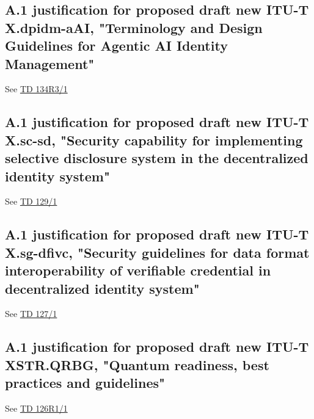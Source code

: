\newpage

\subsection*{A.1 justification for proposed draft new ITU-T X.dpidm-aAI, "Terminology and Design Guidelines for Agentic AI Identity Management"}
See \href{https://www.itu.int/md/meetingdoc.asp?lang=en\&parent=T25-SG17-251203-TD-WP1-0134}{TD 134R3/1}

\newpage

\subsection*{A.1 justification for proposed draft new ITU-T X.sc-sd, "Security capability for implementing selective disclosure system in the decentralized identity system"}
See \href{https://www.itu.int/md/meetingdoc.asp?lang=en\&parent=T25-SG17-251203-TD-WP1-0129}{TD 129/1}

\newpage

\subsection*{A.1 justification for proposed draft new ITU-T X.sg-dfivc, "Security guidelines for data format interoperability of verifiable credential in decentralized identity system"}
See \href{https://www.itu.int/md/meetingdoc.asp?lang=en\&parent=T25-SG17-251203-TD-WP1-0127}{TD 127/1}

\newpage

\subsection*{A.1 justification for proposed draft new ITU-T XSTR.QRBG, "Quantum readiness, best practices and guidelines"}
See \href{https://www.itu.int/md/meetingdoc.asp?lang=en\&parent=T25-SG17-251203-TD-WP1-0126}{TD 126R1/1}

